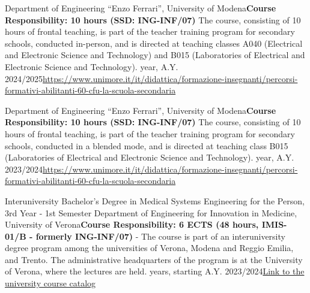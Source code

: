 {
{\newline  Department of Engineering “Enzo Ferrari'', University of Modena\newline \textbf{Course Responsibility: 10 hours (SSD: ING-INF/07)}\newline
    The course, consisting of 10 hours of frontal teaching, is part of the teacher training program for secondary schools, conducted in-person, and is directed at teaching classes A040 (Electrical and Electronic Science and Technology) and B015 (Laboratories of Electrical and Electronic Science and Technology).}{ year, A.Y. 2024/2025}{\href{https://www.unimore.it/it/didattica/formazione-insegnanti/percorsi-formativi-abilitanti-60-cfu-la-scuola-secondaria}{https://www.unimore.it/it/didattica/formazione-insegnanti/percorsi-formativi-abilitanti-60-cfu-la-scuola-secondaria}}

{\newline  Department of Engineering “Enzo Ferrari'', University of Modena\newline \textbf{Course Responsibility: 10 hours (SSD: ING-INF/07)}\newline
    The course, consisting of 10 hours of frontal teaching, is part of the teacher training program for secondary schools, conducted in a blended mode, and is directed at teaching class B015 (Laboratories of Electrical and Electronic Science and Technology).}{ year, A.Y. 2023/2024}{\href{https://www.unimore.it/it/didattica/formazione-insegnanti/percorsi-formativi-abilitanti-60-cfu-la-scuola-secondaria}{https://www.unimore.it/it/didattica/formazione-insegnanti/percorsi-formativi-abilitanti-60-cfu-la-scuola-secondaria}}

{Interuniversity Bachelor's Degree in Medical Systems Engineering for the Person, 3rd Year - 1st Semester}
{\newline  Department of Engineering for Innovation in Medicine, University of Verona}{\newline \textbf{Course Responsibility: 6 ECTS (48 hours, IMIS-01/B - formerly ING-INF/07)} -\newline
    The course is part of an interuniversity degree program among the universities of Verona, Modena and Reggio Emilia, and Trento. The administrative headquarters of the program is at the University of Verona, where the lectures are held. years, starting A.Y. 2023/2024}{\href{https://www.corsi.univr.it/?ent=cs&aa=2024\%2F2025&codiceCs=S25&codins=4S009924&discr=&discrCd=&id=1001&menu=studiare&tab=insegnamenti}{Link to the university course catalog}}

}
